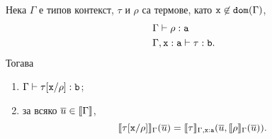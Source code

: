 \begin{framed}
\begin{lemma}\label{lem:pcf:substitution}
  Нека $\Gamma$ е типов контекст, $\tau$ и $\rho$ са термове, като $\texttt{x} \not\in \texttt{dom}(\Gamma)$,
  \begin{align*}
    & \Gamma \vdash \rho : \texttt{a}\\
    & \Gamma, \texttt{x}:\texttt{a} \vdash \tau : \texttt{b}.
  \end{align*}
  Тогава
  \begin{enumerate}[1)]
  \item
    $\Gamma \vdash \tau[\texttt{x}/{\rho}] : \texttt{b}$;
  \item
    за всяко $\overline{u} \in \llbracket{\Gamma}\rrbracket$,
    \[\llbracket{\tau[\texttt{x}/{\rho}]}\rrbracket_\Gamma(\overline{u}) = \llbracket{\tau}\rrbracket_{\Gamma,\texttt{x}:\texttt{a}}(\overline{u},\llbracket{\rho}\rrbracket_\Gamma(\overline{u})).\]
  \end{enumerate}
\end{lemma}
\end{framed}
